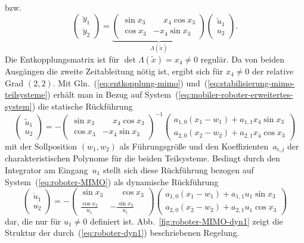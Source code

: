 \begin{example}
\[\]
bzw.
\[
\left(\begin{array}{c}
\ddot{y}_{1}\\
\ddot{y}_{2}
\end{array}\right)=\underbrace{\left(\begin{array}{cc}
\sin x_{3} & \phantom{-}x_{4}\cos x_{3}\\
\cos x_{3} & -x_{4}\sin x_{3}
\end{array}\right)}_{{\displaystyle \Lambda(\tilde{x})}}\left(\begin{array}{c}
\tilde{u}_{1}\\
u_{2}
\end{array}\right).
\]
Die Entkopplungsmatrix ist für $\det\Lambda(\tilde{x})=x_{4}\neq0$
regulär. Da von beiden Ausgängen die zweite Zeitableitung nötig ist,
ergibt sich für $x_{4}\neq0$ der relative Grad $(2,2)$. Mit Gln.~(\ref{eq:entkopplung-mimo})
und~(\ref{eq:stabilisierung-mimo-teilsysteme}) erhält man in Bezug
auf System~(\ref{eq:mobiler-roboter-erweitertes-system}) die statische
Rückführung
\[
\left(\begin{array}{c}
\tilde{u}_{1}\\
u_{2}
\end{array}\right)=-\left(\begin{array}{cc}
\sin x_{3} & \phantom{-}x_{4}\cos x_{3}\\
\cos x_{3} & -x_{4}\sin x_{3}
\end{array}\right)^{-1}\left(\begin{array}{c}
a_{1,0}(x_{1}-w_{1})+a_{1,1}x_{4}\sin x_{3}\\
a_{2,0}(x_{2}-w_{2})+a_{2,1}x_{4}\cos x_{3}
\end{array}\right)
\]
mit der Sollposition $(w_{1},w_{2})$ als Führungsgröße und den Koeffizienten~$a_{i,j}$
der charakteristischen Polynome für die beiden Teilsysteme. Bedingt
durch den Integrator am Eingang~$u_{1}$ stellt sich diese Rückführung
bezogen auf System~(\ref{eq:roboter-MIMO}) als dynamische Rückführung
\begin{equation}
\left(\begin{array}{c}
\dot{u}_{1}\\
u_{2}
\end{array}\right)=-\left(\begin{array}{cc}
\sin x_{3} & \phantom{-}\cos x_{3}\\
\frac{\cos x_{3}}{u_{1}} & -\frac{\sin x_{3}}{u_{1}}
\end{array}\right)\left(\begin{array}{c}
a_{1,0}(x_{1}-w_{1})+a_{1,1}u_{1}\sin x_{3}\\
a_{2,0}(x_{2}-w_{2})+a_{2,1}u_{1}\cos x_{3}
\end{array}\right)\label{eq:roboter-dyn1}
\end{equation}
dar, die nur für $u_{1}\neq0$ definiert ist. Abb.~\ref{fig:roboter-MIMO-dyn1}
zeigt die Struktur der durch~(\ref{eq:roboter-dyn1}) beschriebenen
Regelung.
\end{example}
